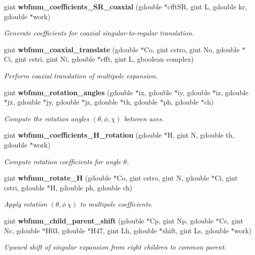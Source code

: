 \begin{DoxyCompactItemize}
gint \textbf{ wbfmm\+\_\+coefficients\+\_\+\+S\+R\+\_\+coaxial} (gdouble $\ast$cfft\+SR, gint L, gdouble kr, gdouble $\ast$work)
\begin{DoxyCompactList}\small\item\em Generate coefficients for coaxial singular-\/to-\/regular translation. \end{DoxyCompactList}\item 
gint \textbf{ wbfmm\+\_\+coaxial\+\_\+translate} (gdouble $\ast$Co, gint cstro, gint No, gdouble $\ast$Ci, gint cstri, gint Ni, gdouble $\ast$cfft, gint L, gboolean complex)
\begin{DoxyCompactList}\small\item\em Perform coaxial translation of multipole expansion. \end{DoxyCompactList}\item 
gint \textbf{ wbfmm\+\_\+rotation\+\_\+angles} (gdouble $\ast$ix, gdouble $\ast$iy, gdouble $\ast$iz, gdouble $\ast$jx, gdouble $\ast$jy, gdouble $\ast$jz, gdouble $\ast$th, gdouble $\ast$ph, gdouble $\ast$ch)
\begin{DoxyCompactList}\small\item\em Compute the rotation angles $(\theta,\phi,\chi)$ between axes. \end{DoxyCompactList}\item 
gint \textbf{ wbfmm\+\_\+coefficients\+\_\+\+H\+\_\+rotation} (gdouble $\ast$H, gint N, gdouble th, gdouble $\ast$work)
\begin{DoxyCompactList}\small\item\em Compute rotation coefficients for angle $\theta$. \end{DoxyCompactList}\item 
gint \textbf{ wbfmm\+\_\+rotate\+\_\+H} (gdouble $\ast$Co, gint cstro, gint N, gdouble $\ast$Ci, gint cstri, gdouble $\ast$H, gdouble ph, gdouble ch)
\begin{DoxyCompactList}\small\item\em Apply rotation $(\theta,\phi\,\chi)$ to multipole coefficients. \end{DoxyCompactList}\item 
gint \textbf{ wbfmm\+\_\+child\+\_\+parent\+\_\+shift} (gdouble $\ast$Cp, gint Np, gdouble $\ast$Cc, gint Nc, gdouble $\ast$H03, gdouble $\ast$H47, gint Lh, gdouble $\ast$shift, gint Ls, gdouble $\ast$work)
\begin{DoxyCompactList}\small\item\em Upward shift of singular expansion from eight children to common parent. \end{DoxyCompactList}\item 

\end{DoxyCompactItemize}
